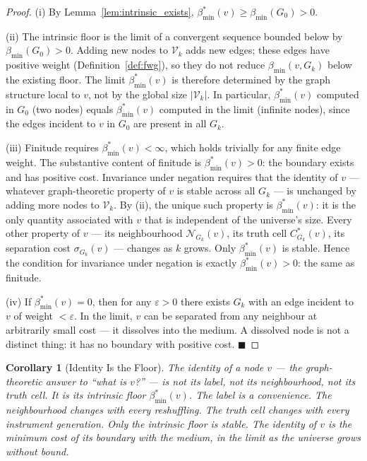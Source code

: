\documentclass[11pt,twocolumn,a4paper]{article}
\theoremstyle{plain}
\newtheorem{corollary}[theorem]{Corollary}
\theoremstyle{definition}
\theoremstyle{remark}
\newcommand{\Nbd}{\mathcal{N}}
\newcommand{\Vcal}{\mathcal{V}}
\newcommand{\bmin}{\beta_{\min}}
\renewcommand{\qed}{\hfill$\blacksquare$}
\begin{document}
\begin{proof}
(i) By Lemma~\ref{lem:intrinsic_exists}, $\bmin^*(v) \geq \bmin(G_0) > 0$.

(ii) The intrinsic floor is the limit of a convergent sequence bounded below
by $\bmin(G_0) > 0$. Adding new nodes to $\Vcal_k$ adds new edges; these
edges have positive weight (Definition~\ref{def:fwg}), so they do not reduce
$\bmin(v, G_k)$ below the existing floor. The limit $\bmin^*(v)$ is therefore
determined by the graph structure local to $v$, not by the global size
$|\Vcal_k|$. In particular, $\bmin^*(v)$ computed in $G_0$ (two nodes) equals
$\bmin^*(v)$ computed in the limit (infinite nodes), since the edges incident
to $v$ in $G_0$ are present in all $G_k$.

(iii) Finitude requires $\bmin^*(v) < \infty$, which holds trivially for
any finite edge weight. The substantive content of finitude is
$\bmin^*(v) > 0$: the boundary exists and has positive cost. Invariance
under negation requires that the identity of $v$ --- whatever graph-theoretic
property of $v$ is stable across all $G_k$ --- is unchanged by adding more
nodes to $\Vcal_k$. By (ii), the unique such property is $\bmin^*(v)$: it
is the only quantity associated with $v$ that is independent of the universe's
size. Every other property of $v$ --- its neighbourhood $\Nbd_{G_k}(v)$, its
truth cell $C^*_{G_k}(v)$, its separation cost $\sigma_{G_k}(v)$ --- changes
as $k$ grows. Only $\bmin^*(v)$ is stable. Hence the condition for invariance
under negation is exactly $\bmin^*(v) > 0$: the same as finitude.

(iv) If $\bmin^*(v) = 0$, then for any $\varepsilon > 0$ there exists $G_k$
with an edge incident to $v$ of weight $< \varepsilon$. In the limit, $v$
can be separated from any neighbour at arbitrarily small cost --- it dissolves
into the medium. A dissolved node is not a distinct thing: it has no boundary
with positive cost. \qed
\end{proof}

\begin{corollary}[Identity Is the Floor]
\label{cor:identity_is_floor}
The identity of a node $v$ --- the graph-theoretic answer to ``what is $v$?''
--- is not its label, not its neighbourhood, not its truth cell. It is its
intrinsic floor $\bmin^*(v)$. The label is a convenience. The neighbourhood
changes with every reshuffling. The truth cell changes with every instrument
generation. Only the intrinsic floor is stable. The identity of $v$ is the
minimum cost of its boundary with the medium, in the limit as the universe
grows without bound.
\end{corollary}
\end{document}
